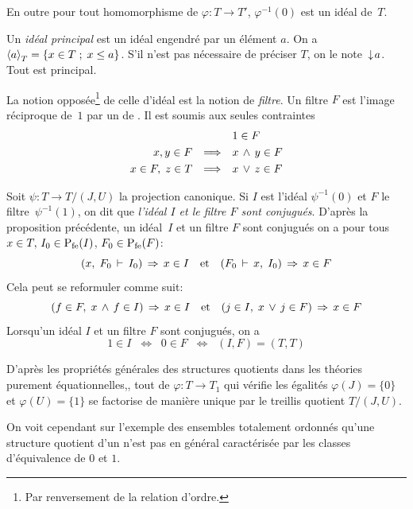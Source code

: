 En outre pour tout homomorphisme de \trdis $\varphi :T\rightarrow T'$,
$\varphi^{-1}(0)$ est un idéal de~$T$.

Un {\em idéal principal} est un idéal engendré par un élément
$a$. On a  $\left\langle{a}\right\rangle_T=\{x\in T\; ;\; x\leq a \}$. S'il n'est pas nécessaire de préciser $T$, on le note $\,\downarrow\! a$. Tout \itf est principal.

La notion opposée\footnote{Par renversement de la relation d'ordre.}  de celle d'idéal est la notion de {\em filtre}.
Un filtre $F$ est l'image réciproque de~$1$ par un \homo de \trdis.
 Il est soumis aux seules contraintes
$$\begin{array}{rcl}
  & &  1 \in F   \\[.3em]
x,y\in F& \Longrightarrow   &  x\,\wedge\, y \in F   \\[.3em]
x\in F,\; z\in T& \Longrightarrow   &  x\,\vee\, z \in F   
\end{array}$$


Soit $\psi:T\rightarrow T/ (J,U)$ la projection canonique.
Si $I$ est l'idéal $\psi^{-1}(0)$ et $F$ le filtre~$\psi^{-1}(1)$, 
on dit  que {\em l'idéal $I$  et le filtre $F$ sont conjugués}.
D'après la proposition précédente, un idéal~$I$  et un filtre $F$
sont conjugués \ssi on a pour tous $x\in T,\,I_0\in{{\rm P}_{{\rm fe}}}(I)$, \hbox{$F_0\in{{\rm P}_{{\rm fe}}}(F)$}:
$$
  (x,\; F_0 \,\vdash\, I_0) \,\Rightarrow\,  x\in I  \quad{\rm  et}\quad 
(F_0 \,\vdash\, x,\;  I_0)\,\Rightarrow\,  x\in F
$$
Cela peut se reformuler comme suit:
$$
(f\in F,\; x\,\wedge\, f \in I) \,\Rightarrow\, x\in I
\quad {\rm et}\quad
(j\in I,\; x\,\vee\, j \in F) \,\Rightarrow\, x\in F
$$
Lorsqu'un idéal $I$ et un filtre $F$  sont conjugués, on a
$$
1\in I\; \;\Longleftrightarrow\;\;  0\in F
\;\; \Longleftrightarrow\;\;  (I,F)=(T,T)
$$

D'après les propriétés générales des structures quotients dans les théories purement équationnelles,, tout \homo de \trdis $\varphi:T\to T_1$ qui vérifie les égalités
$\varphi(J)=\{0\}$ et $\varphi(U)=\{1\}$  se factorise de manière unique
par le treillis quotient $T/(J,U)$.

On voit cependant sur l'exemple des ensembles totalement ordonnés
qu'une structure quotient d'un \trdi n'est pas en général
caractérisée par les classes d'équivalence de $0$ et $1$.

